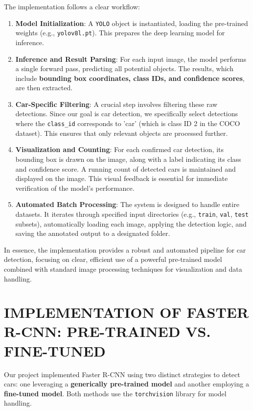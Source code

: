 \documentclass[conference]{IEEEtran}
\begin{document}
The implementation follows a clear workflow:

\begin{enumerate}
    \item \textbf{Model Initialization}: A \texttt{YOLO} object is instantiated, loading the pre-trained weights (e.g., \texttt{yolov8l.pt}). This prepares the deep learning model for inference.
    \item \textbf{Inference and Result Parsing}: For each input image, the model performs a single forward pass, predicting all potential objects. The results, which include \textbf{bounding box coordinates, class IDs, and confidence scores}, are then extracted.
    \item \textbf{Car-Specific Filtering}: A crucial step involves filtering these raw detections. Since our goal is car detection, we specifically select detections where the \texttt{class\_id} corresponds to 'car' (which is class ID 2 in the COCO dataset). This ensures that only relevant objects are processed further.
    \item \textbf{Visualization and Counting}: For each confirmed car detection, its bounding box is drawn on the image, along with a label indicating its class and confidence score. A running count of detected cars is maintained and displayed on the image. This visual feedback is essential for immediate verification of the model's performance.
    \item \textbf{Automated Batch Processing}: The system is designed to handle entire datasets. It iterates through specified input directories (e.g., \texttt{train}, \texttt{val}, \texttt{test} subsets), automatically loading each image, applying the detection logic, and saving the annotated output to a designated folder.
\end{enumerate}

In essence, the implementation provides a robust and automated pipeline for car detection, focusing on clear, efficient use of a powerful pre-trained model combined with standard image processing techniques for visualization and data handling.


\section{\uppercase{Implementation of Faster R-CNN: Pre-trained vs. Fine-tuned}} 
\label{sec:fasterrcnn_implementations}

Our project implemented Faster R-CNN using two distinct strategies to detect cars: one leveraging a \textbf{generically pre-trained model} and another employing a \textbf{fine-tuned model}. Both methods use the \texttt{torchvision} library for model handling.
\end{document}

